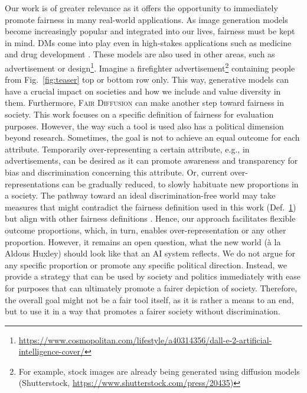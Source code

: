 \documentclass{article}%
\begin{document}
Our work is of greater relevance as it offers the opportunity to immediately promote fairness in many real-world applications. As image generation models become increasingly popular and integrated into our lives, fairness must be kept in mind. DMs come into play even in high-stakes applications such as medicine and drug development \cite{Watson2022protein}. These models are also used in other areas, such as advertisement or design\footnote{\url{https://www.cosmopolitan.com/lifestyle/a40314356/dall-e-2-artificial-intelligence-cover/}}. Imagine a firefighter advertisement\footnote{For example, stock images are already being generated using diffusion models (Shutterstock, \url{https://www.shutterstock.com/press/20435})} containing people from Fig.~\ref{fig:teaser} top or bottom row only. This way, generative models can have a crucial impact on societies and how we include and value diversity in them. 
Furthermore, \textsc{Fair Diffusion} can make another step toward fairness in society. This work focuses on a specific definition of fairness for evaluation purposes. However, the way such a tool is used also has a political dimension beyond research. Sometimes, the goal is not to achieve an equal outcome for each attribute. Temporarily over-representing a certain attribute, e.g., in advertisements, can be desired as it can promote awareness and transparency for bias and discrimination concerning this attribute. Or, current over-representations can be gradually reduced, to slowly habituate new proportions in a society. The pathway toward an ideal discrimination-free world may take measures that might contradict the fairness definition used in this work (Def.~\hyperref[def:fair1]{1}) but align with other fairness definitions \cite{mehrabi21surveybias}. Hence, our approach facilitates flexible outcome proportions, which, in turn, enables over-representation or any other proportion.
However, it remains an open question, what the new world (à la Aldous Huxley) should look like that an AI system reflects. We do not argue for any specific proportion or promote any specific political direction. Instead, we provide a strategy that can be used by society and politics immediately with ease for purposes that can ultimately promote a fairer depiction of society. Therefore, the overall goal might not be a fair tool itself, as it is rather a means to an end, but to use it in a way that promotes a fairer society without discrimination.
\end{document}
